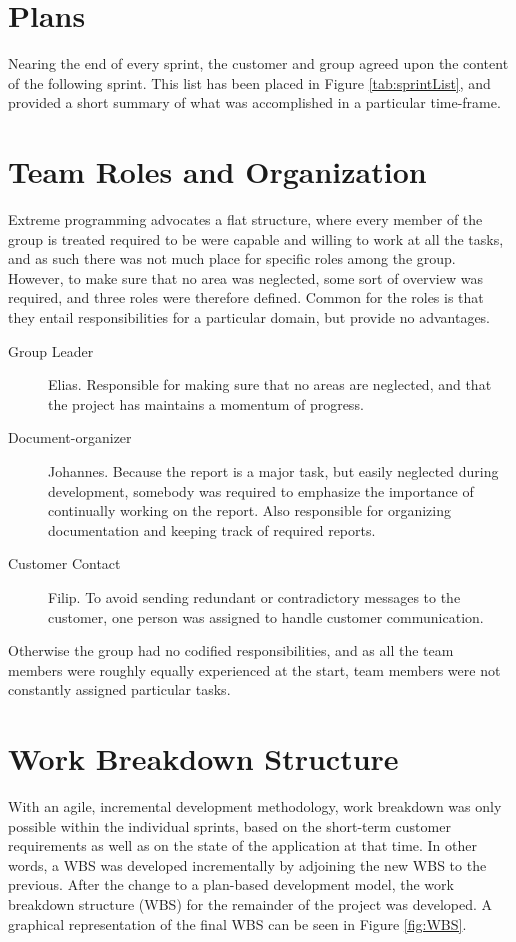 
\section{Plans}	

Nearing the end of every sprint, the customer and group agreed upon the content of the following sprint. This list has been placed in Figure \ref{tab:sprintList}, and provided a short summary of what was accomplished in a particular time-frame. 


\section{Team Roles and Organization}
Extreme programming advocates a flat structure, where every member of the group is treated required to be were capable and willing to work at all the tasks, and as such there was not much place for specific roles among the group. However, to make sure that no area was neglected, some sort of overview was required, and three roles were therefore defined. Common for the roles is that they entail responsibilities for a particular domain, but provide no advantages.

\begin{description}
\item[Group Leader] Elias. Responsible for making sure that no areas are neglected, and that the project has maintains a momentum of progress.
\item[Document-organizer] Johannes. Because the report is a major task, but easily neglected during development, somebody was required to emphasize the importance of continually working on the report. Also responsible for organizing documentation and keeping track of required reports.
\item[Customer Contact] Filip. To avoid sending redundant or contradictory messages to the customer, one person was assigned to handle customer communication.
\end{description}
 
 Otherwise the group had no codified responsibilities, and as all the team members were roughly equally experienced at the start, team members were not constantly assigned particular tasks.
 
\section{Work Breakdown Structure}
With an agile, incremental development methodology, work breakdown was only possible within the individual sprints, based on the short-term customer requirements as well as on the state of the application at that time. In other words, a WBS was developed incrementally by adjoining the new WBS to the previous. After the change to a plan-based development model, the work breakdown structure (WBS) for the remainder of the project was developed. A graphical representation of the final WBS can be seen in Figure \ref{fig:WBS}.

